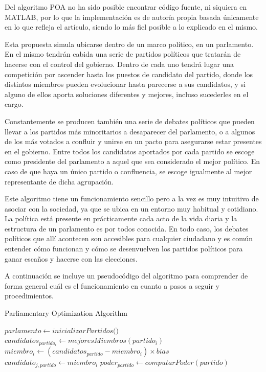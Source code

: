 Del algoritmo POA no ha sido posible encontrar código fuente, ni siquiera en MATLAB, por lo que la implementación es de autoría propia basada únicamente en lo que refleja el artículo, siendo lo más fiel posible a lo explicado en el mismo.

Esta propuesta simula ubicarse dentro de un marco político, en un parlamento. En el mismo tendrán cabida una serie de partidos políticos que tratarán de hacerse con el control del gobierno. Dentro de cada uno tendrá lugar una competición por ascender hasta los puestos de candidato del partido, donde los distintos miembros pueden evolucionar hasta parecerse a sus candidatos, y si alguno de ellos aporta soluciones diferentes y mejores, incluso sucederles en el cargo.

Constantemente se producen también una serie de debates políticos que pueden llevar a los partidos más minoritarios a desaparecer del parlamento, o a algunos de los más votados a confluir y unirse en un pacto para asegurarse estar presentes en el gobierno. Entre todos los candidatos aportados por cada partido se escoge como presidente del parlamento a aquel que sea considerado el mejor político. En caso de que haya un único partido o confluencia, se escoge igualmente al mejor representante de dicha agrupación.

Este algoritmo tiene un funcionamiento sencillo pero a la vez es muy intuitivo de asociar con la sociedad, ya que se ubica en un entorno muy habitual y cotidiano. La política está presente en prácticamente cada acto de la vida diaria y la estructura de un parlamento es por todos conocida. En todo caso, los debates políticos que allí acontecen son accesibles para cualquier ciudadano y es común entender cómo funcionan y cómo se desenvuelven los partidos políticos para ganar escaños y hacerse con las elecciones.

A continuación se incluye un pseudocódigo del algoritmo para comprender de forma general cuál es el funcionamiento en cuanto a pasos a seguir y procedimientos.

\begin{algorithm}
	\caption{Parliamentary Optimization Algorithm}
	\begin{algorithmic}[1]
		\State $parlamento \gets \textit{inicializarPartidos()}$
		\State $candidatos_{partido_i} \gets mejoresMiembros(partido_i)$
		\State $miembro_i \gets (candidatos_{partido} - miembro_i) \times bias$
		\State $candidato_{j,partido} \gets miembro_i$
		\EndIf
		\State $poder_{partido} \gets computarPoder(partido)$
		\EndFor
		\EndWhile
	\end{algorithmic}
\end{algorithm}

